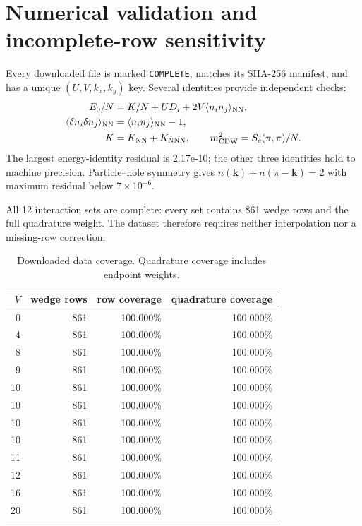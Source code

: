 \documentclass[10pt]{article}
\newcommand{\vk}{\mathbf{k}}
\begin{document}
\section{Numerical validation and incomplete-row sensitivity}

Every downloaded file is marked \texttt{COMPLETE}, matches its SHA-256 manifest,
and has a unique $(U,V,k_x,k_y)$ key.  Several identities provide independent checks:
\begin{align*}
E_0/N &= K/N+UD_i+2V\langle n_i n_j\rangle_{\rm NN},\\
\langle\delta n_i\delta n_j\rangle_{\rm NN}
&=\langle n_i n_j\rangle_{\rm NN}-1,\\
K&=K_{\rm NN}+K_{\rm NNN},\qquad
m_{\rm CDW}^2=S_c(\pi,\pi)/N.
\end{align*}
The largest energy-identity residual is 2.17e-10; the other three identities
hold to machine precision.  Particle--hole symmetry gives
$n(\vk)+n(\pi-\vk)=2$ with maximum residual below $7\times10^{-6}$.

All 12 interaction sets are complete: every set contains 861 wedge rows and the full
quadrature weight.  The dataset therefore requires neither interpolation nor a
missing-row correction.

\begin{table}[htbp]
\centering
\caption{Downloaded data coverage.  Quadrature coverage includes endpoint weights.}
\begin{tabular}{rrrr}
\toprule
$V$ & wedge rows & row coverage & quadrature coverage\\
\midrule
0 & 861 & 100.000\% & 100.000\% \\
4 & 861 & 100.000\% & 100.000\% \\
8 & 861 & 100.000\% & 100.000\% \\
9 & 861 & 100.000\% & 100.000\% \\
10 & 861 & 100.000\% & 100.000\% \\
10 & 861 & 100.000\% & 100.000\% \\
10 & 861 & 100.000\% & 100.000\% \\
10 & 861 & 100.000\% & 100.000\% \\
11 & 861 & 100.000\% & 100.000\% \\
12 & 861 & 100.000\% & 100.000\% \\
16 & 861 & 100.000\% & 100.000\% \\
20 & 861 & 100.000\% & 100.000\% \\
\bottomrule
\end{tabular}
\end{table}
\end{document}
